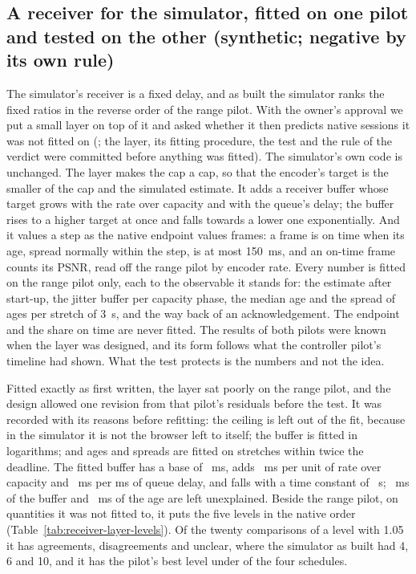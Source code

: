 \ifdefined\ReceiverLayerVerdict
\subsection{A receiver for the simulator, fitted on one pilot and tested on the other (synthetic; negative by its own rule)}
\label{sec:receiver-layer}
The simulator's receiver is a fixed delay, and as built the simulator ranks the fixed ratios in the reverse order of the range pilot. With the owner's approval we put a small layer on top of it and asked whether it then predicts native sessions it was not fitted on (; the layer, its fitting procedure, the test and the rule of the verdict were committed before anything was fitted). The simulator's own code is unchanged. The layer makes the cap a cap, so that the encoder's target is the smaller of the cap and the simulated estimate. It adds a receiver buffer whose target grows with the rate over capacity and with the queue's delay; the buffer rises to a higher target at once and falls towards a lower one exponentially. And it values a step as the native endpoint values frames: a frame is on time when its age, spread normally within the step, is at most 150~ms, and an on-time frame counts its PSNR, read off the range pilot by encoder rate. Every number is fitted on the range pilot only, each to the observable it stands for: the estimate after start-up, the jitter buffer per capacity phase, the median age and the spread of ages per stretch of 3~s, and the way back of an acknowledgement. The endpoint and the share on time are never fitted. The results of both pilots were known when the layer was designed, and its form follows what the controller pilot's timeline had shown. What the test protects is the numbers and not the idea.

Fitted exactly as first written, the layer sat poorly on the range pilot, and the design allowed one revision from that pilot's residuals before the test. It was recorded with its reasons before refitting: the ceiling is left out of the fit, because in the simulator it is not the browser left to itself; the buffer is fitted in logarithms; and ages and spreads are fitted on stretches within twice the deadline. The fitted buffer has a base of \ReceiverLayerBase~ms, adds \ReceiverLayerPerLoad~ms per unit of rate over capacity and \ReceiverLayerPerQueue~ms per ms of queue delay, and falls with a time constant of \ReceiverLayerFall~s; \ReceiverLayerBufferLeft~ms of the buffer and \ReceiverLayerAgeLeft~ms of the age are left unexplained. Beside the range pilot, on quantities it was not fitted to, it puts the five levels in the native order (Table~\ref{tab:receiver-layer-levels}). Of the twenty comparisons of a level with 1.05 it has \ReceiverLayerInAgree{} agreements, \ReceiverLayerInDisagree{} disagreements and \ReceiverLayerInUnclear{} unclear, where the simulator as built had 4, 6 and 10, and it has the pilot's best level under \ReceiverLayerInBest{} of the four schedules.

